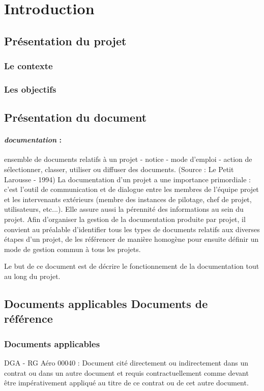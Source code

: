 \section{Introduction}     
  \subsection{Présentation du projet}  
    \subsubsection{Le contexte}      
    \subsubsection{Les objectifs}     
  \subsection{Présentation du document}
  \paragraph*{\textit{documentation} :}ensemble de documents relatifs à un projet - notice - mode d’emploi - action de sélectionner, classer, utiliser ou diffuser des documents. (Source : Le Petit Larousse - 1994)
La documentation d’un projet a une importance primordiale : c’est l’outil de communication et de dialogue entre les membres de l’équipe projet et les intervenants extérieurs (membre des instances de pilotage, chef de projet, utilisateurs, etc...). Elle assure aussi la pérennité des informations au sein du projet.
Afin d’organiser la gestion de la documentation produite par projet, il convient au préalable d’identifier tous les types de documents relatifs aux diverses étapes d’un projet, de les référencer de manière homogène pour ensuite définir un mode de gestion commun à tous les projets.
\par Le but de ce document est de décrire le fonctionnement de la documentation tout au long du projet.
  \subsection{Documents applicables Documents de référence}
    \subsubsection{Documents applicables}
      DGA - RG Aéro 00040 : Document cité directement ou indirectement dans un contrat ou dans un autre document et requis contractuellement comme devant être impérativement appliqué au titre de ce contrat ou de cet autre document.
